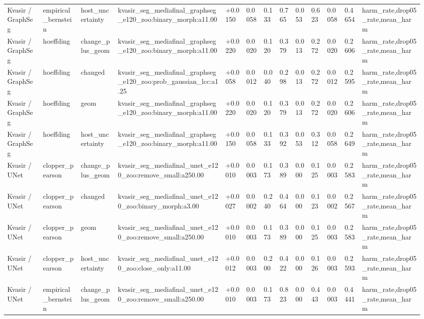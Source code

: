 \begin{table}[t]
\begin{tabular}{lllllllllllll}
Kvasir / GraphSeg & empirical\_bernstein & host\_uncertainty & kvasir\_seg\_mediafinal\_graphseg\_e120\_zoo:binary\_morph:a11.00 & +0.0150 & 0.0058 & 0.133 & 0.765 & 0.053 & 0.623 & 0.0058 & 0.4654 & harm\_rate,drop05\_rate,mean\_harm \\
Kvasir / GraphSeg & hoeffding & change\_plus\_geom & kvasir\_seg\_mediafinal\_graphseg\_e120\_zoo:binary\_morph:a11.00 & +0.0220 & 0.0020 & 0.120 & 0.379 & 0.013 & 0.272 & 0.0020 & 0.2606 & harm\_rate,drop05\_rate,mean\_harm \\
Kvasir / GraphSeg & hoeffding & changed & kvasir\_seg\_mediafinal\_graphseg\_e120\_zoo:prob\_gaussian\_lcc:a1.25 & +0.0058 & 0.0012 & 0.040 & 0.298 & 0.013 & 0.272 & 0.0012 & 0.2595 & harm\_rate,drop05\_rate,mean\_harm \\
Kvasir / GraphSeg & hoeffding & geom & kvasir\_seg\_mediafinal\_graphseg\_e120\_zoo:binary\_morph:a11.00 & +0.0220 & 0.0020 & 0.120 & 0.379 & 0.013 & 0.272 & 0.0020 & 0.2606 & harm\_rate,drop05\_rate,mean\_harm \\
Kvasir / GraphSeg & hoeffding & host\_uncertainty & kvasir\_seg\_mediafinal\_graphseg\_e120\_zoo:binary\_morph:a11.00 & +0.0150 & 0.0058 & 0.133 & 0.392 & 0.053 & 0.312 & 0.0058 & 0.2649 & harm\_rate,drop05\_rate,mean\_harm \\
Kvasir / UNet & clopper\_pearson & change\_plus\_geom & kvasir\_seg\_mediafinal\_unet\_e120\_zoo:remove\_small:a250.00 & +0.0010 & 0.0003 & 0.173 & 0.389 & 0.000 & 0.125 & 0.0003 & 0.2583 & harm\_rate,drop05\_rate,mean\_harm \\
Kvasir / UNet & clopper\_pearson & changed & kvasir\_seg\_mediafinal\_unet\_e120\_zoo:binary\_morph:a3.00 & +0.0027 & 0.0002 & 0.240 & 0.464 & 0.000 & 0.123 & 0.0002 & 0.2567 & harm\_rate,drop05\_rate,mean\_harm \\
Kvasir / UNet & clopper\_pearson & geom & kvasir\_seg\_mediafinal\_unet\_e120\_zoo:remove\_small:a250.00 & +0.0010 & 0.0003 & 0.173 & 0.389 & 0.000 & 0.125 & 0.0003 & 0.2583 & harm\_rate,drop05\_rate,mean\_harm \\
Kvasir / UNet & clopper\_pearson & host\_uncertainty & kvasir\_seg\_mediafinal\_unet\_e120\_zoo:close\_only:a11.00 & +0.0012 & 0.0003 & 0.200 & 0.422 & 0.000 & 0.126 & 0.0003 & 0.2593 & harm\_rate,drop05\_rate,mean\_harm \\
Kvasir / UNet & empirical\_bernstein & change\_plus\_geom & kvasir\_seg\_mediafinal\_unet\_e120\_zoo:remove\_small:a250.00 & +0.0010 & 0.0003 & 0.173 & 0.823 & 0.000 & 0.443 & 0.0003 & 0.4441 & harm\_rate,drop05\_rate,mean\_harm \\

\end{tabular}
\end{table}

